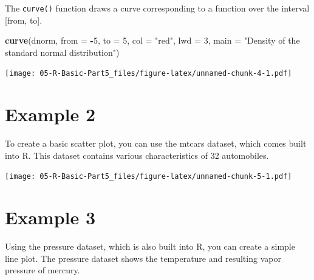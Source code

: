 \documentclass[
]{book}
\newenvironment{Shaded}{\begin{snugshade}}{\end{snugshade}}
\newcommand{\AttributeTok}[1]{\textcolor[rgb]{0.13,0.29,0.53}{#1}}
\newcommand{\DecValTok}[1]{\textcolor[rgb]{0.00,0.00,0.81}{#1}}
\newcommand{\FunctionTok}[1]{\textcolor[rgb]{0.13,0.29,0.53}{\textbf{#1}}}
\newcommand{\NormalTok}[1]{#1}
\newcommand{\SpecialCharTok}[1]{\textcolor[rgb]{0.81,0.36,0.00}{\textbf{#1}}}
\newcommand{\StringTok}[1]{\textcolor[rgb]{0.31,0.60,0.02}{#1}}
\begin{document}
The \texttt{curve()} function draws a curve corresponding to a function over the interval {[}from, to{]}.

\begin{Shaded}
\begin{Highlighting}[]
\FunctionTok{curve}\NormalTok{(dnorm, }\AttributeTok{from =} \SpecialCharTok{{-}}\DecValTok{5}\NormalTok{, }\AttributeTok{to =} \DecValTok{5}\NormalTok{, }\AttributeTok{col =} \StringTok{"red"}\NormalTok{, }\AttributeTok{lwd =} \DecValTok{3}\NormalTok{,}
      \AttributeTok{main =} \StringTok{"Density of the standard normal distribution"}\NormalTok{)}
\end{Highlighting}
\end{Shaded}

\texttt{[image: 05-R-Basic-Part5\_files/figure-latex/unnamed-chunk-4-1.pdf]}

\section*{Example 2}\label{example-2}

To create a basic scatter plot, you can use the mtcars dataset, which comes built into R. This dataset contains various characteristics of 32 automobiles.

\begin{Shaded}
\end{Shaded}

\texttt{[image: 05-R-Basic-Part5\_files/figure-latex/unnamed-chunk-5-1.pdf]}

\section*{Example 3}\label{example-3}

Using the pressure dataset, which is also built into R, you can create a simple line plot. The pressure dataset shows the temperature and resulting vapor pressure of mercury.
\end{document}
